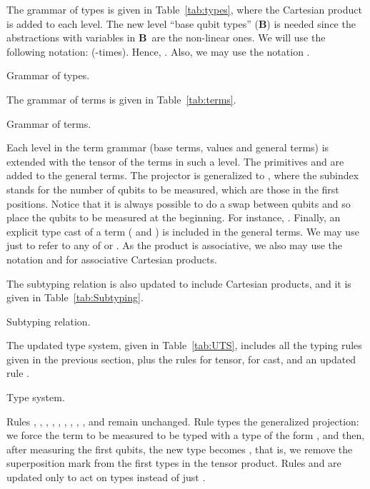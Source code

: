 \documentclass[preprint]{elsarticle}
\newcommand\bqtypes{\ensuremath{\mathbf B}}
\begin{document}
The grammar of types is given in Table~\ref{tab:types}, where the Cartesian
product is added to each level. The new level ``base qubit types'' (\bqtypes) is needed
since the abstractions with variables in \bqtypes\ are the non-linear ones.
We will use the following notation:  (-times).
Hence, . Also, we may use the notation .
\begin{table}
  \centering
  
  \caption{Grammar of types.}
  \label{tab:types}
\end{table}

The grammar of terms is given in Table~\ref{tab:terms}.
\begin{table}
  \centering
  
  \caption{Grammar of terms.}
  \label{tab:terms}
\end{table}

Each level in the term grammar (base terms, values and general terms) is
extended with the tensor of the terms in such a level. The primitives 
and  are added to the general terms. The projector  is generalized
to , where the subindex  stands for the number of qubits to be
measured, which are those in the first  positions.
Notice that it is always possible to do a swap between qubits and so place the
qubits to be measured at the beginning. For instance, .
Finally, an explicit type cast of a term  ( and ) is included in the
general terms. We may use just  to refer to any of  or
. As the product is associative, we also may use the notation  and  for associative Cartesian products.

The subtyping relation is also updated to include Cartesian products, and it is
given in Table~\ref{tab:Subtyping}.
\begin{table}[!h]
  \centering
  
  
  
  \caption{Subtyping relation.}
  \label{tab:Subtyping}
\end{table}

The updated type system, given in Table~\ref{tab:UTS}, includes all the typing
rules given in the previous section, plus the rules for tensor, for cast, and an
updated rule .

\begin{table}
  \centering
  
  \caption{Type system.}
  \label{tab:UTS}
\end{table}

Rules , , , , ,
, , , ,  and
 remain unchanged. Rule  types the generalized
projection: we force the term to be measured to be typed with a type of the form
, and then, after measuring the first  qubits, the new type becomes
, that is, we remove the superposition mark 
from the first  types in the tensor product. Rules  and  are updated
only to act on types  instead of just .
\end{document}

